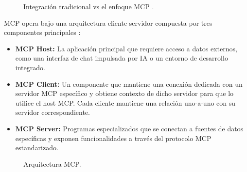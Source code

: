 \begin{figure}[H]
  \centering
  \caption{Integración tradicional vs el enfoque MCP \cite{mcp1foto}.}
  \label{fig:mcp1}
\end{figure}


MCP opera bajo una arquitectura cliente-servidor compuesta por tres componentes principales \cite{mcp_arch}:

\begin{itemize}
\item \textbf{MCP Host:} La aplicación principal que requiere acceso a datos externos, como una interfaz de chat impulsada por IA o un entorno de desarrollo integrado.
\item \textbf{MCP Client:} Un componente que mantiene una conexión dedicada con un servidor MCP específico y obtiene contexto de dicho servidor para que lo utilice el host MCP. Cada cliente mantiene una relación uno-a-uno con su servidor correspondiente.
\item \textbf{MCP Server:} Programas especializados que se conectan a fuentes de datos específicas y exponen funcionalidades a través del protocolo MCP estandarizado.
\end{itemize}

\begin{figure}[H]
  \centering
  \caption{Arquitectura MCP.}
  \label{fig:mcp2}
\end{figure}

